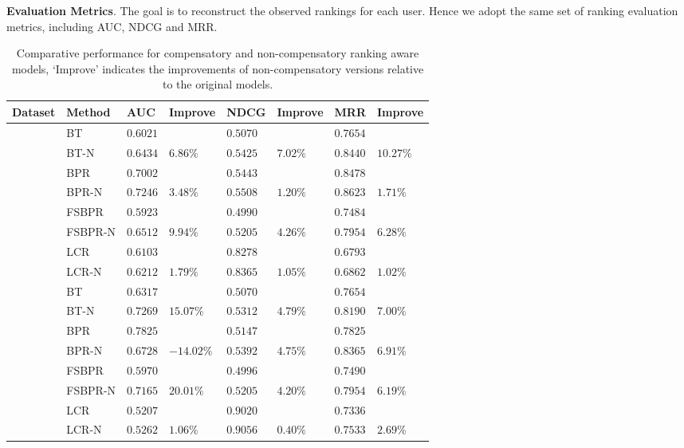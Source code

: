 \documentclass[letterpaper]{article} %
\begin{document}
\textbf{Evaluation Metrics}.  The goal is to reconstruct the observed rankings for each user. Hence we adopt the same set of ranking evaluation metrics, including AUC, NDCG and MRR. 
\begin{table}[htp]
\tiny
\caption{Comparative performance for compensatory and non-compensatory ranking aware models, `Improve' indicates the improvements of non-compensatory versions relative to the original models.}
\begin{center}
\begin{tabular}{p{0.4cm}<{\centering}|p{1.2cm}<{\centering} |p{0.5cm} p{0.6cm} |p{0.5cm} p{0.6cm} |p{0.5cm} p{0.6cm}}
\hline
Dataset	& Method	& AUC	& Improve&	NDCG&	Improve&	MRR	&Improve\\\hline
{} &	BT	& $0.6021$ 	& &	$0.5070$ 	&&	$0.7654$ 	&\\
	&BT-N	&$0.6434$ &	$6.86\%$	&$0.5425 $	&$7.02\%$	&$0.8440$ &	$10.27\%$	\\
	&BPR&	$0.7002$ 	&&	$0.5443$ 	&&	$0.8478$ &\\
	&BPR-N	&$0.7246$ 	&$3.48\%$	&$0.5508$ &	$1.20\%$	&$0.8623$ 	&$1.71\%$	\\
	&FSBPR		&$0.5923$&	&$0.4990$ 	&&	$0.7484$&\\	
	&FSBPR-N	&$0.6512$	&$9.94\%$	&	$0.5205$ 	&$4.26\%$	&$0.7954$ 	&$6.28\%$	\\
	&LCR		&$0.6103$&	&$0.8278$ 	&&	$0.6793$&\\	
	&LCR-N	&$0.6212$	&$1.79\%$	&	$0.8365$ 	&$1.05\%$	&$0.6862$ 	&$1.02\%$ \\

	\hline
{}	&	BT	& $0.6317 $ 	& &	$0.5070$ 	&&	$0.7654$ 	&\\
	&BT-N	&$0.7269$ &	$15.07\%$	&$0.5312 $	&$4.79\%$	&$0.8190$ &	$7.00\%$	\\
	&BPR&	$0.7825$ 	&&	$0.5147$ 	&&	$0.7825$ &\\
	&BPR-N	&$0.6728$ 	&$-14.02\%$	&$0.5392$ &	$4.75\%$	&$0.8365$ 	&$6.91\%$	\\
	&FSBPR		&$0.5970$&	&$0.4996$ 	&&	$0.7490$&\\	
	&FSBPR-N	&$0.7165$	&$20.01\%$	&	$0.5205$ 	&$4.20\%$	&$0.7954$ 	&$6.19\%$	\\
	&LCR		&$0.5207$&	&$0.9020$ 	&&	$0.7336$&\\	
	&LCR-N	&$0.5262$	&$1.06\%$	&	$0.9056$ 	&$0.40\%$	&$0.7533$ 	&$2.69\%$ \\


\end{tabular}
\end{center}
\end{table}
\end{document}
